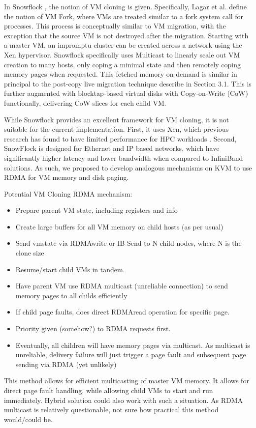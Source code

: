 In Snowflock \cite{lagar2009snowflock, lagar2011snowflock}, the notion of VM cloning is given. Specifically, Lagar et al. define the notion of VM Fork, where VMs are treated similar to a fork\(\) system call for processes.   This process is conceptually similar to VM migration, with the exception that the source VM is not destroyed after the migration. Starting with a master VM, an impromptu cluster can be created across a network using the Xen hypervisor.  Snowflock specifically uses Multicast to linearly scale out VM creation to many hosts, only coping a minimal state and then remotely coping memory pages when requested.  This fetched memory on-demand is similar in principal to the post-copy live migration technique describe in Section 3.1.  This is further augmented with blocktap-based virtual disks with Copy-on-Write (CoW) functionally, delivering CoW slices for each child VM. 

While Snowflock provides an excellent framework for VM cloning, it is not suitable for the current implementation. First, it uses Xen, which previous research has found to have limited performance for HPC workloads \cite{Younge2011cloud}.  Second, SnowFlock is designed for Ethernet and IP based networks, which have significantly higher latency and lower bandwidth when compared to InfiniBand solutions. As such, we proposed to develop analogous mechanisms on KVM to use RDMA for VM memory and disk paging. 

Potential VM Cloning RDMA mechanism:
\begin{itemize}
\item Prepare parent VM state, including registers and info
\item Create large buffers for all VM memory on child hosts (as per usual)
\item Send vmstate via RDMAwrite or IB Send to N child nodes, where N is the clone size
\item Resume/start child VMs in tandem. 
\item Have parent VM use RDMA multicast (unreliable connection) to send memory pages to all childs efficiently
\item If child page faults, does direct RDMAread operation for specific page. 
\item Priority given (somehow?) to RDMA requests first. 
\item Eventually, all children will have memory pages via multicast. As multicast is unreliable, delivery failure will just trigger a page fault and subsequent page sending via RDMA (yet unlikely)
\end{itemize}

This method allows for efficient multicasting of master VM memory.  It allows for direct page fault handling, while allowing child VMs to start and run immediately. Hybrid solution could also work with such a situation.  As RDMA multicast is relatively questionable, not sure how practical this method would/could be.



